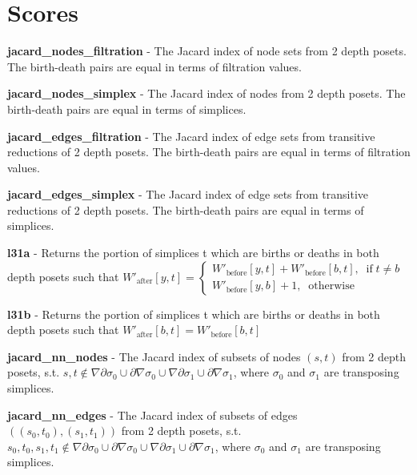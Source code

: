 \documentclass{article}
\begin{document}
\section{Scores}

\par \textbf{jacard\_nodes\_filtration} -
The Jacard index of node sets from 2 depth posets.
The birth-death pairs are equal in terms of filtration values.


\par \textbf{jacard\_nodes\_simplex} -
The Jacard index of nodes from 2 depth posets.
The birth-death pairs are equal in terms of simplices.


\par \textbf{jacard\_edges\_filtration} -
The Jacard index of edge sets from transitive reductions of 2 depth posets.
The birth-death pairs are equal in terms of filtration values.


\par \textbf{jacard\_edges\_simplex} -
The Jacard index of edge sets from transitive reductions of 2 depth posets.
The birth-death pairs are equal in terms of simplices.


\par \textbf{l31a} -
Returns the portion of simplices t which are births or deaths in both depth posets such that
$
W'_\text{after}[y, t] =
\begin{cases}
W'_\text{before}[y, t] + W'_\text{before}[b, t], \;\; \text{if}\; t\ne b \\
W'_\text{before}[y, b] + 1, \;\; \text{otherwise}
\end{cases}
$


\par \textbf{l31b} -
Returns the portion of simplices t which are births or deaths in both depth posets such that
$W'_\text{after}[b, t] = W'_\text{before}[b, t]$


\par \textbf{jacard\_nn\_nodes} -
The Jacard index of subsets of nodes $(s, t)$ from 2 depth posets, s.t.
$s, t \notin \nabla\partial\sigma_0 \cup \partial\nabla\sigma_0 \cup \nabla\partial\sigma_1 \cup \partial\nabla\sigma_1$,
where $\sigma_0$ and $\sigma_1$ are transposing simplices.


\par \textbf{jacard\_nn\_edges} -
The Jacard index of subsets of edges $((s_0, t_0), (s_1, t_1))$ from 2 depth posets, s.t.
$s_0, t_0, s_1, t_1 \notin \nabla\partial\sigma_0 \cup \partial\nabla\sigma_0 \cup \nabla\partial\sigma_1 \cup \partial\nabla\sigma_1$,
where $\sigma_0$ and $\sigma_1$ are transposing simplices.
\end{document}
